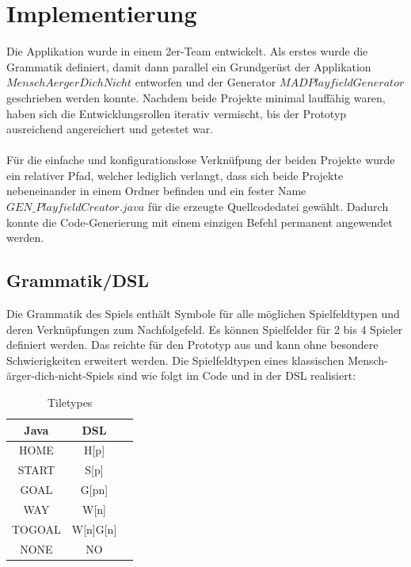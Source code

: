 \documentclass[conference]{IEEEtran}
\begin{document}
\section{Implementierung}
Die Applikation wurde in einem 2er-Team entwickelt. Als erstes wurde die Grammatik definiert, damit dann parallel
ein Grundger\"ust der Applikation $MenschAergerDichNicht$ entworfen und der Generator $MADPlayfieldGenerator$ geschrieben werden konnte. Nachdem beide Projekte minimal lauff\"ahig waren, haben sich die Entwicklungsrollen iterativ vermischt, bis der Prototyp ausreichend angereichert und getestet
war.
\\\\
F\"ur die einfache und konfigurationslose Verkn\"ufpung der beiden Projekte wurde ein relativer Pfad, welcher lediglich verlangt, dass sich beide Projekte nebeneinander in einem Ordner befinden und ein fester Name $GEN\_PlayfieldCreator.java$ f\"ur die erzeugte Quellcodedatei gew\"ahlt.
Dadurch konnte die Code-Generierung mit einem einzigen Befehl permanent angewendet werden.

\subsection{Grammatik/DSL}
  Die Grammatik des Spiels enth\"alt Symbole f\"ur alle m\"oglichen Spielfeldtypen und deren Verkn\"upfungen zum Nachfolgefeld.
  Es k\"onnen Spielfelder f\"ur 2 bis 4 Spieler definiert werden. Das reichte f\"ur den Prototyp aus und kann ohne besondere
  Schwierigkeiten erweitert werden. Die Spielfeldtypen eines klassischen Mensch-\"arger-dich-nicht-Spiels sind wie folgt im Code und in der DSL realisiert:

\begin{table}[h!]
  \centering
  \caption{Tiletypes}
  \label{tab:table1}
  \begin{tabular}{ccc}
    \toprule
    Java & DSL\\
    \midrule
    HOME & H[p]\\
    START & S[p]\\
    GOAL & G[pn] \\
    WAY & W[n] \\
    TOGOAL & W[n]G[n] \\
    NONE & NO \\
    \bottomrule
  \end{tabular}
\end{table}
\end{document}
